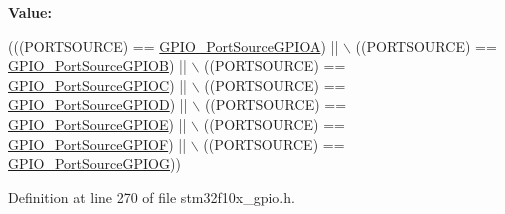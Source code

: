 {\bfseries Value\+:}
\begin{DoxyCode}
(((PORTSOURCE) == \hyperlink{group___g_p_i_o___port___sources_gacddaa6b6535b5de02ba99e75111c4924}{GPIO\_PortSourceGPIOA}) || \(\backslash\)
                                              ((PORTSOURCE) == 
      \hyperlink{group___g_p_i_o___port___sources_ga20a7ea6589564aee1fd5344bf01e65e5}{GPIO\_PortSourceGPIOB}) || \(\backslash\)
                                              ((PORTSOURCE) == 
      \hyperlink{group___g_p_i_o___port___sources_ga7511e96933d503ecf7128ebaff613e7e}{GPIO\_PortSourceGPIOC}) || \(\backslash\)
                                              ((PORTSOURCE) == 
      \hyperlink{group___g_p_i_o___port___sources_ga68309c29660ae328d3699781520e3d21}{GPIO\_PortSourceGPIOD}) || \(\backslash\)
                                              ((PORTSOURCE) == 
      \hyperlink{group___g_p_i_o___port___sources_ga8b849f35292768d73a9f9a76cac96456}{GPIO\_PortSourceGPIOE}) || \(\backslash\)
                                              ((PORTSOURCE) == 
      \hyperlink{group___g_p_i_o___port___sources_ga19dfaf7ac2cdf66b697bcd8665b860ef}{GPIO\_PortSourceGPIOF}) || \(\backslash\)
                                              ((PORTSOURCE) == 
      \hyperlink{group___g_p_i_o___port___sources_ga43af0aa9b42aefa2c7d24dfa9889040b}{GPIO\_PortSourceGPIOG}))
\end{DoxyCode}


Definition at line 270 of file stm32f10x\+\_\+gpio.\+h.

